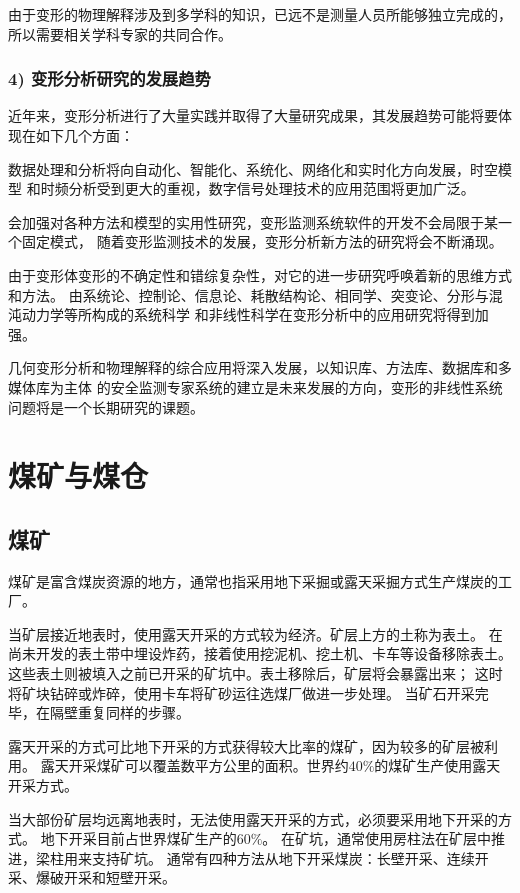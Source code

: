 由于变形的物理解释涉及到多学科的知识，已远不是测量人员所能够独立完成的，
所以需要相关学科专家的共同合作。

\subsubsection*{4) 变形分析研究的发展趋势}
近年来，变形分析进行了大量实践并取得了大量研究成果，其发展趋势可能将要体现在如下几个方面：
\begin{asparaitem}[$\bullet$]
\item 数据处理和分析将向自动化、智能化、系统化、网络化和实时化方向发展，时空模型
和时频分析受到更大的重视，数字信号处理技术的应用范围将更加广泛。
\item 会加强对各种方法和模型的实用性研究，变形监测系统软件的开发不会局限于某一个固定模式，
随着变形监测技术的发展，变形分析新方法的研究将会不断涌现。
\item 由于变形体变形的不确定性和错综复杂性，对它的进一步研究呼唤着新的思维方式和方法。
由系统论、控制论、信息论、耗散结构论、相同学、突变论、分形与混沌动力学等所构成的系统科学
和非线性科学在变形分析中的应用研究将得到加强。
\item 几何变形分析和物理解释的综合应用将深入发展，以知识库、方法库、数据库和多媒体库为主体
的安全监测专家系统的建立是未来发展的方向，变形的非线性系统问题将是一个长期研究的课题。
\end{asparaitem}


\section{煤矿与煤仓}
\subsection{煤矿}
煤矿是富含煤炭资源的地方，通常也指采用地下采掘或露天采掘方式生产煤炭的工厂。

当矿层接近地表时，使用露天开采的方式较为经济。矿层上方的土称为表土。
在尚未开发的表土带中埋设炸药，接着使用挖泥机、挖土机、卡车等设备移除表土。
这些表土则被填入之前已开采的矿坑中。表土移除后，矿层将会暴露出来；
这时将矿块钻碎或炸碎，使用卡车将矿砂运往选煤厂做进一步处理。
当矿石开采完毕，在隔壁重复同样的步骤。

露天开采的方式可比地下开采的方式获得较大比率的煤矿，因为较多的矿层被利用。
露天开采煤矿可以覆盖数平方公里的面积。世界约$40\%$的煤矿生产使用露天开采方式。

当大部份矿层均远离地表时，无法使用露天开采的方式，必须要采用地下开采的方式。
地下开采目前占世界煤矿生产的$60\%$。
在矿坑，通常使用房柱法在矿层中推进，梁柱用来支持矿坑。
通常有四种方法从地下开采煤炭：长壁开采、连续开采、爆破开采和短壁开采。

